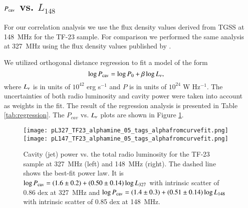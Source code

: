 \documentclass{aa}  %
\begin{document}
\subsection{$P_{\rm{cav}}$ vs. $L_{148}$}
\label{sec:PvsL148}

For our correlation analysis we use the flux density values derived from TGSS at 148~MHz for the TF-23 sample. 
For comparison we performed the same analysis at 327~MHz using the flux density values published by \cite{Birzan2008}.

We utilized orthogonal distance regression to fit a model of the form
\begin{equation}
\label{equ:Pcav_LD_fit}
\log{P_{\rm{cav}}} = \log{P_{0}} + \beta\log{L_{\rm{\nu}}},
\end{equation}
where $L_{\rm{\nu}}$ is in units of $10^{42}$ erg s$^{-1}$ and $P$ is in units of $10^{24}$ W Hz$^{-1}$.
The uncertainties of both radio luminosity and cavity power were taken into account as weights in the fit.
The result of the regression analysis is presented in Table \ref{tab:regression}. The $P_{cav}$ vs. $L_{\rm{\nu}}$ plots are shown in Figure \ref{fig:P_vs_L148_L327}.


\begin{figure*}[t]
\begin{center}
\texttt{[image: pL327\_TF23\_alphamine\_05\_tags\_alphafromcurvefit.png]}
\texttt{[image: pL147\_TF23\_alphamine\_05\_tags\_alphafromcurvefit.png]}
\end{center}
\caption{\small Cavity (jet) power vs. the total radio luminosity for the TF-23 sample at 327~MHz (left) and 148~MHz (right). The dashed line shows the best-fit power law. It is $\log{P_{\rm{cav}}} = (1.6 \pm 0.2) + (0.50 \pm 0.14)\log{L_{327}}$ with intrinsic scatter of 0.86 dex at 327~MHz and $\log{P_{\rm{cav}}} = (1.4 \pm 0.3) + (0.51 \pm 0.14)\log{L_{148}}$ with intrinsic scatter of 0.85 dex at 148~MHz. 
\label{fig:P_vs_L148_L327}}
\vspace{0.15in}
\end{figure*}
\end{document}
